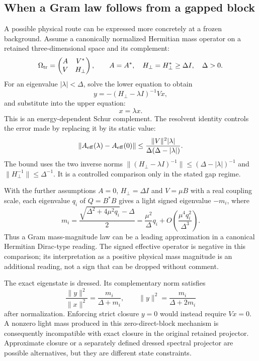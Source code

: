 \subsection{When a Gram law follows from a gapped block}
A possible physical route can be expressed more concretely at a
frozen background. Assume a canonically normalized Hermitian mass
operator on a retained three-dimensional space and its complement:
\begin{equation}
 \Omega_{\rm tr}=\begin{pmatrix}A&V^*\\V&H_\perp\end{pmatrix},
 \qquad A=A^*,\quad H_\perp=H_\perp^*\geq\Delta I,
 \quad \Delta>0.
\end{equation}
For an eigenvalue $|\lambda|<\Delta$, solve the lower equation to obtain
\begin{equation}
 y=-(H_\perp-\lambda I)^{-1}Vx,
\end{equation}
and substitute into the upper equation:
\begin{equation}
 [A-V^*(H_\perp-\lambda I)^{-1}V]x=\lambda x.
\end{equation}
This is an energy-dependent Schur complement. The resolvent identity
controls the error made by replacing it by its static value:
\begin{equation}
 \|A_{\rm eff}(\lambda)-A_{\rm eff}(0)\|
 \leq\frac{\|V\|^2|\lambda|}{\Delta(\Delta-|\lambda|)}.
\end{equation}
The bound uses the two inverse norms
$\|(H_\perp-\lambda I)^{-1}\|\leq(\Delta-|\lambda|)^{-1}$
and $\|H_\perp^{-1}\|\leq\Delta^{-1}$. It is a controlled
comparison only in the stated gap regime.

With the further assumptions $A=0$, $H_\perp=\Delta I$ and
$V=\mu B$ with a real coupling scale, each eigenvalue $q_i$ of $Q=B^*B$ gives a light
signed eigenvalue $-m_i$, where
\begin{equation}
 m_i=\frac{\sqrt{\Delta^2+4\mu^2q_i}-\Delta}{2}
 =\frac{\mu^2}{\Delta}q_i
  +O\left(\frac{\mu^4q_i^2}{\Delta^3}\right).
\end{equation}
Thus a Gram mass-magnitude law can be a leading approximation in
a canonical Hermitian Dirac-type reading. The signed effective
operator is negative in this comparison; its interpretation as a
positive physical mass magnitude is an additional reading, not
a sign that can be dropped without comment.

The exact eigenstate is dressed. Its complementary norm satisfies
\begin{equation}
 \frac{\|y\|^2}{\|x\|^2}=\frac{m_i}{\Delta+m_i},\qquad
 \|y\|^2=\frac{m_i}{\Delta+2m_i}
\end{equation}
after normalization. Enforcing strict closure $y=0$ would instead
require $Vx=0$. A nonzero light mass produced in this zero-direct-block
mechanism is consequently incompatible with exact closure in the
original retained projector. Approximate closure or a separately
defined dressed spectral projector are possible alternatives, but
they are different state constraints.

